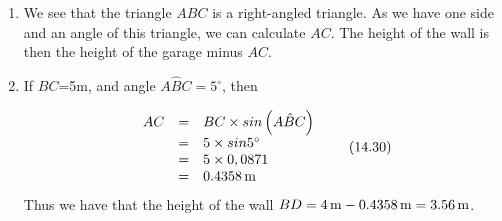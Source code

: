 {\begin{mdframed}[linewidth=4, leftmargin=40, rightmargin=40]
\begin{exercise}
\begin{enumerate}[noitemsep, label=\textbf{Step} \textbf{\arabic*}. ]
            \leftskip=20pt\rightskip=\leftskip\item  
        \label{m39411*id83116}We see that the triangle $ABC$ is a right-angled triangle. As we have one side and an angle of this triangle, we can calculate $AC$. The height of the wall is then the height of the garage minus $AC$.\par 
        \item  
        \label{m39411*id83164}If $BC$=5m, and angle $A\hat{B}C={5}^{\circ }$, then\par 
        \label{m39411*id83209}\nopagebreak\noindent{}
          
    \begin{equation}
    \begin{array}{ccc}\hfill AC& =& BC\ensuremath{\times}sin\left(A\hat{B}C\right)\hfill \\ & =& 5\ensuremath{\times}sin{5}^{\circ }\hfill \\ & =& 5\ensuremath{\times}0,0871\hfill \\ & =& 0.4358\phantom{\rule{0.166667em}{0ex}}\mathrm{m}\hfill \end{array}\tag{14.30}
      \end{equation}
        \label{m39411*id83338}Thus we have that the height of the wall $BD=4\phantom{\rule{0.166667em}{0ex}}\mathrm{m}-0.4358\phantom{\rule{0.166667em}{0ex}}\mathrm{m}=3.56\phantom{\rule{0.166667em}{0ex}}\mathrm{m}$.
 \par 
        \end{enumerate}
    \end{exercise}
    \end{mdframed}
    }
    \noindent
\label{m39411*secfhsst!!!underscore!!!id1847}
